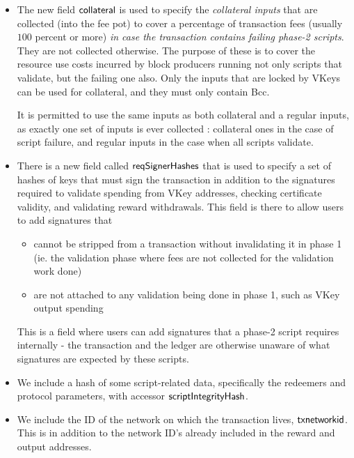 \begin{itemize}
  \item The new field $\mathsf{collateral}$ is used to specify the \emph{collateral inputs}
    that are collected (into the fee pot) to cover a percentage of
    transaction fees (usually $100$ percent or more)
    \emph{in case the transaction contains failing phase-2 scripts}. They are not collected otherwise.
    The purpose of these is to cover the resource use costs incurred by block producers running not only
    scripts that validate, but the failing one also. Only the inputs that are locked by VKeys can
    be used for collateral, and they must only contain Bcc.

    It is permitted to use the same inputs as both collateral and a regular inputs, as exactly
    one set of inputs is ever collected : collateral ones in the case of script failure, and regular inputs
    in the case when all scripts validate.

  \item There is a new field called $\mathsf{reqSignerHashes}$ that is used to specify a set of hashes
  of keys that must sign the transaction in addition to the signatures required to validate
  spending from VKey addresses, checking certificate validity, and validating reward withdrawals.
  This field is there to allow users to add signatures that
  \begin{itemize}
    \item cannot be stripped from a transaction without invalidating it in phase 1 (ie. the
    validation phase where fees are not collected for the validation work done)
    \item are not attached to any validation being done in phase 1, such as VKey output spending
  \end{itemize}

  This is a field where users can add signatures that a phase-2 script requires internally -
  the transaction and the ledger are otherwise unaware of what signatures are expected by these scripts.

  \item We include a hash of some script-related data, specifically the redeemers and protocol parameters,
    with accessor $\mathsf{scriptIntegrityHash}$.

  \item We include the ID of the network on which the transaction lives, $\mathsf{txnetworkid}$.
  This is in addition to the network ID's already included in the reward and output addresses.
\end{itemize}

